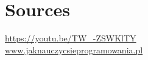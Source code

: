 \documentclass[11pt,a4paper]{article}
\begin{document}
\section{Sources}
\begin{scriptsize}
\url{https://youtu.be/TW_-ZSWKlTY}\\
\url{www.jaknauczycsieprogramowania.pl}
\end{scriptsize}
\end{document}
